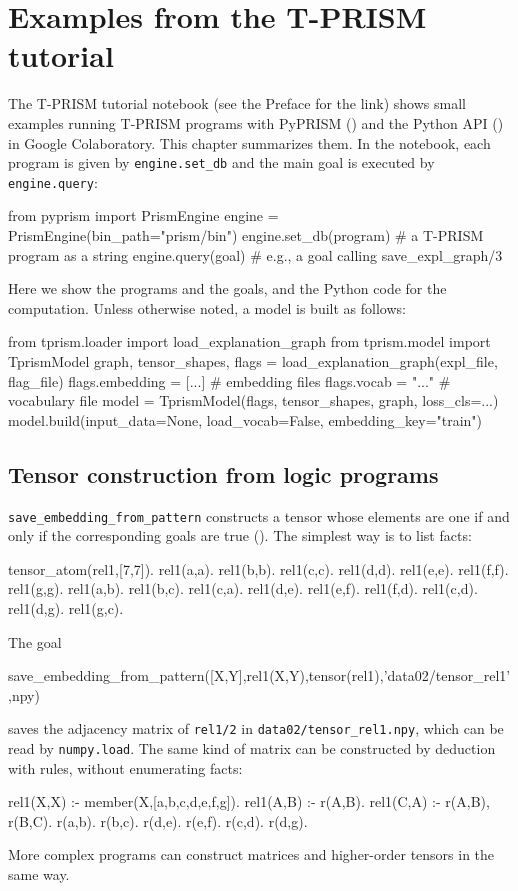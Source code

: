\documentclass[a4paper]{report}
\begin{document}
\chapter{Examples from the T-PRISM tutorial}
\label{chap:tutorial}

The T-PRISM tutorial notebook (see the Preface for the link) shows small
examples running T-PRISM programs with PyPRISM ()
and the Python API () in Google Colaboratory.
This chapter summarizes them.  In the notebook, each program is given by
{\tt engine.set\_db} and the main goal is executed by {\tt engine.query}:
\begin{pythoncode}
from pyprism import PrismEngine
engine = PrismEngine(bin_path="prism/bin")
engine.set_db(program)      # a T-PRISM program as a string
engine.query(goal)          # e.g., a goal calling save_expl_graph/3
\end{pythoncode}
Here we show the programs and the goals, and the Python code for the
computation.  Unless otherwise noted, a model is built as follows:
\begin{pythoncode}
from tprism.loader import load_explanation_graph
from tprism.model import TprismModel
graph, tensor_shapes, flags = load_explanation_graph(expl_file, flag_file)
flags.embedding = [...]     # embedding files
flags.vocab = "..."         # vocabulary file
model = TprismModel(flags, tensor_shapes, graph, loss_cls=...)
model.build(input_data=None, load_vocab=False, embedding_key="train")
\end{pythoncode}

\section{Tensor construction from logic programs}
\label{sec:tutorial_construction}

{\tt save\_embedding\_from\_pattern} constructs a tensor whose elements are one if and only if the corresponding goals are true ().  The simplest way is to list facts:
\begin{prologcode}
tensor_atom(rel1,[7,7]).
rel1(a,a). rel1(b,b). rel1(c,c). rel1(d,d). rel1(e,e). rel1(f,f). rel1(g,g).
rel1(a,b). rel1(b,c). rel1(c,a).
rel1(d,e). rel1(e,f). rel1(f,d).
rel1(c,d). rel1(d,g). rel1(g,c).
\end{prologcode}
The goal
\begin{prologcode}
save_embedding_from_pattern([X,Y],rel1(X,Y),tensor(rel1),'data02/tensor_rel1',npy)
\end{prologcode}
saves the adjacency matrix of {\tt rel1/2} in {\tt data02/tensor\_rel1.npy},
which can be read by {\tt numpy.load}.  The same kind of matrix can be
constructed by deduction with rules, without enumerating facts:
\begin{prologcode}
rel1(X,X) :- member(X,[a,b,c,d,e,f,g]).
rel1(A,B) :- r(A,B).
rel1(C,A) :- r(A,B), r(B,C).
r(a,b). r(b,c). r(d,e). r(e,f). r(c,d). r(d,g).
\end{prologcode}
More complex programs can construct matrices and higher-order tensors in the same way.
\end{document}

